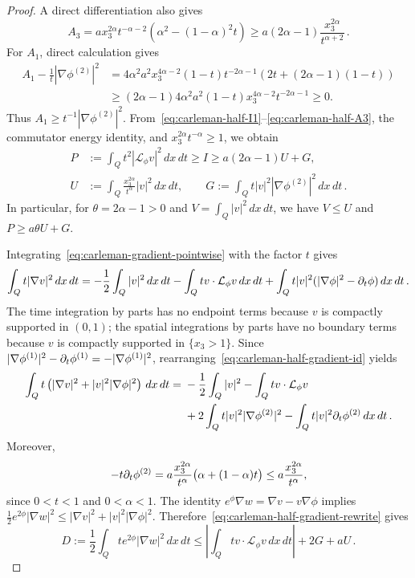 \documentclass[11pt,letterpaper]{article}
\numberwithin{equation}{section}
\theoremstyle{plain}
\theoremstyle{definition}
\theoremstyle{remark}
\begin{document}
\begin{proof}
A direct differentiation also gives
\begin{equation}\label{eq:carleman-half-A3}
 A_3=a x_3^{2\alpha}t^{-\alpha-2}
       \left(\alpha^2-(1-\alpha)^2t\right)
 \ge a(2\alpha-1)\frac{x_3^{2\alpha}}{t^{\alpha+2}}\,.
\end{equation}
For $A_1$, direct calculation gives
\begin{align*}
 A_1-\frac1t|\nabla\phi^{(2)}|^2
 &=4\alpha^2a^2x_3^{4\alpha-2}(1-t)t^{-2\alpha-1}
       \left(2t+(2\alpha-1)(1-t)\right)\\
 &\ge(2\alpha-1)4\alpha^2a^2(1-t)x_3^{4\alpha-2}t^{-2\alpha-1}\ge0.
\end{align*}
Thus $A_1\ge t^{-1}|\nabla\phi^{(2)}|^2$. From~\eqref{eq:carleman-half-I1}--\eqref{eq:carleman-half-A3}, the commutator energy identity, and $x_3^{2\alpha}t^{-\alpha}\ge1$, we obtain
\begin{equation}\label{eq:carleman-half-mass}
\begin{aligned}
 P&:=\int_Q t^2|\mathcal L_\phi v|^2\,dx\,dt
       \ge I\ge a(2\alpha-1)U+G,\\
 U&:=\int_Q\frac{x_3^{2\alpha}}{t^\alpha}|v|^2\,dx\,dt,
 \qquad G:=\int_Qt|v|^2|\nabla\phi^{(2)}|^2\,dx\,dt\,.
\end{aligned}
\end{equation}
In particular, for $\theta=2\alpha-1>0$ and $V=\int_Q|v|^2\,dx\,dt$, we have
$V\le U$ and $P\ge a\theta U+G$.

Integrating~\eqref{eq:carleman-gradient-pointwise} with the factor $t$ gives
\begin{equation}\label{eq:carleman-half-gradient-id}
 \int_Qt|\nabla v|^2\,dx\,dt
 =-\frac12\int_Q|v|^2\,dx\,dt-\int_Qtv\cdot\mathcal L_\phi v\,dx\,dt
   +\int_Qt|v|^2(|\nabla\phi|^2-\partial_t\phi)\,dx\,dt\,.
\end{equation}
The time integration by parts has no endpoint terms because $v$ is compactly supported in $(0,1)$; the spatial integrations by parts have no boundary terms because $v$ is compactly supported in $\{x_3>1\}$. Since
$|\nabla\phi^{(1)}|^2-\partial_t\phi^{(1)}=-|\nabla\phi^{(1)}|^2$, rearranging~\eqref{eq:carleman-half-gradient-id} yields
\begin{align}\label{eq:carleman-half-gradient-rewrite}
 \int_Q t\left(|\nabla v|^2+|v|^2|\nabla\phi|^2\right)\,dx\,dt
 ={}&-\frac12\int_Q|v|^2-\int_Qtv\cdot\mathcal L_\phi v\\
 &+2\int_Qt|v|^2|\nabla\phi^{(2)}|^2
   -\int_Qt|v|^2\partial_t\phi^{(2)}\,dx\,dt\,.
\end{align}
Moreover,
\[
 -t\partial_t\phi^{(2)}
 =a\frac{x_3^{2\alpha}}{t^\alpha}\big(\alpha+(1-\alpha)t\big)
 \le a\frac{x_3^{2\alpha}}{t^\alpha},
\]
since $0<t<1$ and $0<\alpha<1$. The identity
$e^\phi\nabla w=\nabla v-v\nabla\phi$ implies
$\tfrac12e^{2\phi}|\nabla w|^2\le|\nabla v|^2+|v|^2|\nabla\phi|^2$. Therefore~\eqref{eq:carleman-half-gradient-rewrite} gives
\begin{equation}\label{eq:carleman-half-gradient-estimate}
 D:=\frac12\int_Qt e^{2\phi}|\nabla w|^2\,dx\,dt
 \le\left|\int_Qtv\cdot\mathcal L_\phi v\,dx\,dt\right|+2G+aU\,.
\end{equation}


\end{proof}
\end{document}

